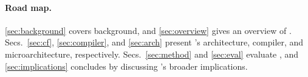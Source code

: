 \paragraph{Road map.}
%
\autoref{sec:background} covers background, and
\autoref{sec:overview} gives an overview of \riptide.
%
Secs.~\ref{sec:cf}, \ref{sec:compiler}, and \ref{sec:arch} present
\riptide's architecture, compiler, and microarchitecture, respectively.
%
Secs.~\ref{sec:method} and \ref{sec:eval} evaluate \riptide, and
\autoref{sec:implications} concludes by discussing \riptide's broader implications.

%
%
